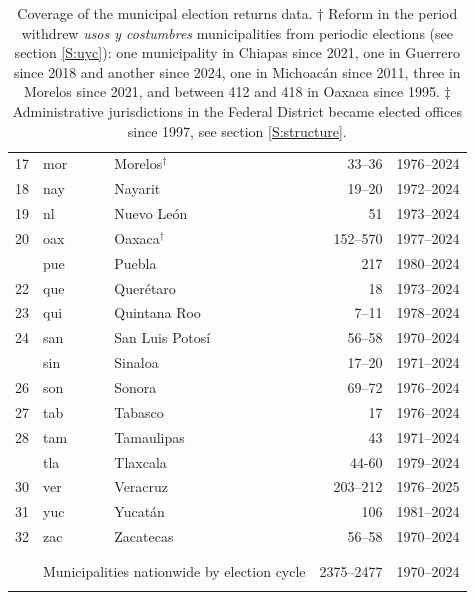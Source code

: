 \documentclass[letter,12pt]{article}
\newcommand{\mc}{\multicolumn}
\begin{document}
\begin{table}
{\begin{tabular}{rllrc}
      17 & mor & Morelos$^\dagger$                      &     33--36           & 1976--2024 \\
      18 & nay & Nayarit                               &     19--20           & 1972--2024 \\
      19 & nl  & Nuevo León                            &         51           & 1973--2024 \\
      20 & oax & Oaxaca$^\dagger$                       &    152--570          & 1977--2024 \\ \hdashline
      21 & pue & Puebla                                &        217           & 1980--2024 \\
      22 & que & Querétaro                             &         18           & 1973--2024 \\
      23 & qui & Quintana Roo                          &      7--11           & 1978--2024 \\
      24 & san & San Luis Potosí                       &     56--58           & 1970--2024 \\ \hdashline
      25 & sin & Sinaloa                               &     17--20           & 1971--2024 \\
      26 & son & Sonora                                &     69--72           & 1976--2024 \\
      27 & tab & Tabasco                               &         17           & 1976--2024 \\
      28 & tam & Tamaulipas                            &         43           & 1971--2024 \\ \hdashline
      29 & tla & Tlaxcala                              &      44-60           & 1979--2024 \\
      30 & ver & Veracruz                              &   203--212           & 1976--2025 \\
      31 & yuc & Yucatán                               &        106           & 1981--2024 \\
      32 & zac & Zacatecas                             &     56--58           & 1970--2024 \\
      \\ [-1.8ex] \hline
      \\ [-1.8ex] 
         & \mc{2}{l}{Municipalities nationwide by election cycle} & 2375--2477 & 1970--2024 \\
      \\ [-1.8ex] \hline

    \end{tabular}
}
\caption{Coverage of the municipal election returns data. $\dagger$  Reform in the period withdrew \emph{usos y costumbres} municipalities from periodic elections (see section \ref{S:uyc}): one municipality in Chiapas since 2021, one in Guerrero since 2018 and another since 2024, one in Michoacán since 2011, three in Morelos since 2021, and between 412 and 418 in Oaxaca since 1995. $\ddagger$ Administrative jurisdictions in the Federal District became elected offices since 1997, see section \ref{S:structure}.}\label{T:coverage}
\end{table}
\end{document}
